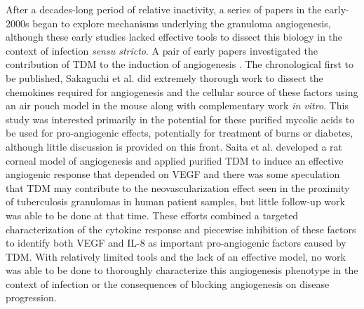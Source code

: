 After a decades-long period of relative inactivity, a series of papers in the early-2000s began to explore mechanisms underlying the granuloma angiogenesis, although these early studies lacked effective tools to dissect this biology in the context of infection \textit{sensu stricto}. A pair of early papers investigated the contribution of TDM to the induction of angiogenesis . The chronological first to be published, Sakaguchi et al. did extremely thorough work to dissect the chemokines required for angiogenesis and the cellular source of these factors using an air pouch model in the mouse along with complementary work \textit{in vitro}. This study was interested primarily in the potential for these purified mycolic acids to be used for pro-angiogenic effects, potentially for treatment of burns or diabetes, although little discussion is provided on this front. Saita et al. developed a rat corneal model of angiogenesis and applied purified TDM to induce an effective angiogenic response that depended on VEGF and there was some speculation that TDM may contribute to the neovascularization effect seen in the proximity of tuberculosis granulomas in human patient samples, but little follow-up work was able to be done at that time. These efforts combined a targeted characterization of the cytokine response and piecewise inhibition of these factors to identify both VEGF and IL-8 as important pro-angiogenic factors caused by TDM. With relatively limited tools and the lack of an effective model, no work was able to be done to thoroughly characterize this angiogenesis phenotype in the context of infection or the consequences of blocking angiogenesis on disease progression.


